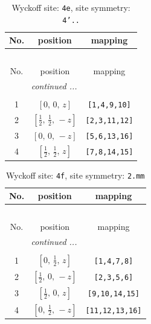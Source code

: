 \documentclass[fleqn,8pt]{jsarticle}
\begin{document}
\begin{longtable}{ccc}
\caption{Wyckoff site: {\tt 4e}, site symmetry: {\tt 4'..}}
 \\
 \hline \hline
No. & position & mapping \\ \hline \endfirsthead

\multicolumn{2}{l}{\tablename\ \thetable{}} \\
 \hline \hline
No. & position & mapping \\ \hline \endhead

 \hline \hline
\multicolumn{2}{r}{\footnotesize\it continued ...} \\ \endfoot

 \hline \hline
\multicolumn{2}{r}{} \\ \endlastfoot

1 & $\left[ 0,\, 0,\, z \right]$ & {\tt [1,4,9,10]} \\ \hline
2 & $\left[ \frac{1}{2},\, \frac{1}{2},\, - z \right]$ & {\tt [2,3,11,12]} \\ \hline
3 & $\left[ 0,\, 0,\, - z \right]$ & {\tt [5,6,13,16]} \\ \hline
4 & $\left[ \frac{1}{2},\, \frac{1}{2},\, z \right]$ & {\tt [7,8,14,15]} \\
\end{longtable}
\renewcommand{\arraystretch}{1.2}
\begin{longtable}{ccc}
\caption{Wyckoff site: {\tt 4f}, site symmetry: {\tt 2.mm}}
 \\
 \hline \hline
No. & position & mapping \\ \hline \endfirsthead

\multicolumn{2}{l}{\tablename\ \thetable{}} \\
 \hline \hline
No. & position & mapping \\ \hline \endhead

 \hline \hline
\multicolumn{2}{r}{\footnotesize\it continued ...} \\ \endfoot

 \hline \hline
\multicolumn{2}{r}{} \\ \endlastfoot

1 & $\left[ 0,\, \frac{1}{2},\, z \right]$ & {\tt [1,4,7,8]} \\ \hline
2 & $\left[ \frac{1}{2},\, 0,\, - z \right]$ & {\tt [2,3,5,6]} \\ \hline
3 & $\left[ \frac{1}{2},\, 0,\, z \right]$ & {\tt [9,10,14,15]} \\ \hline
4 & $\left[ 0,\, \frac{1}{2},\, - z \right]$ & {\tt [11,12,13,16]} \\
\end{longtable}
\end{document}
